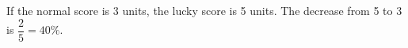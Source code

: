 If the normal score is 3 units, the lucky score is 5 units. The decrease from 5 to 3 is $\dfrac{2}{5}=\boxed{40\%}$.
